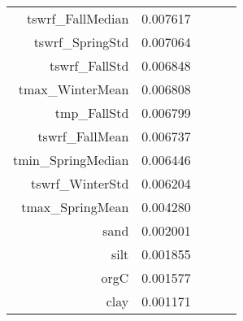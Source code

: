 \begin{tabular}{rrrrr}
tswrf_FallMedian & 0.007617 \\
tswrf_SpringStd & 0.007064 \\
tswrf_FallStd & 0.006848 \\
tmax_WinterMean & 0.006808 \\
tmp_FallStd & 0.006799 \\
tswrf_FallMean & 0.006737 \\
tmin_SpringMedian & 0.006446 \\
tswrf_WinterStd & 0.006204 \\
tmax_SpringMean & 0.004280 \\
sand & 0.002001 \\
silt & 0.001855 \\
orgC & 0.001577 \\
clay & 0.001171 \\
\bottomrule
\end{tabular}

